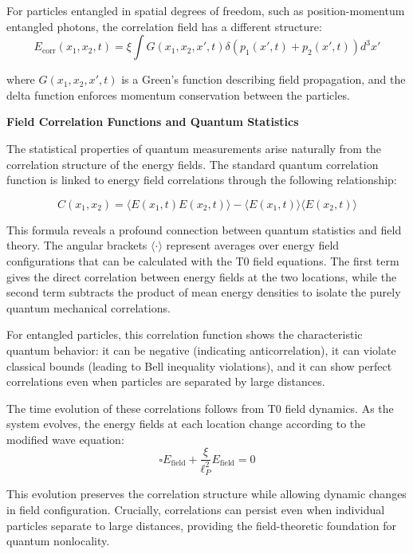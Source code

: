 \documentclass[12pt,a4paper]{article}
\newcommand{\xipar}{\xi}
\theoremstyle{definition}
\theoremstyle{remark}
\begin{document}
For particles entangled in spatial degrees of freedom, such as position-momentum entangled photons, the correlation field has a different structure:
\begin{equation}
	E_{\text{corr}}(x_1,x_2,t) = \xipar \int G(x_1,x_2,x',t) \delta(p_1(x',t) + p_2(x',t)) d^3x'
	\label{eq:position_momentum_correlation}
\end{equation}

where $G(x_1,x_2,x',t)$ is a Green's function describing field propagation, and the delta function enforces momentum conservation between the particles.

\textbf{Field Correlation Functions and Quantum Statistics}

The statistical properties of quantum measurements arise naturally from the correlation structure of the energy fields. The standard quantum correlation function is linked to energy field correlations through the following relationship:

\begin{equation}
	C(x_1,x_2) = \langle E(x_1,t) E(x_2,t) \rangle - \langle E(x_1,t) \rangle \langle E(x_2,t) \rangle
	\label{eq:field_correlation_function}
\end{equation}

This formula reveals a profound connection between quantum statistics and field theory. The angular brackets $\langle \cdot \rangle$ represent averages over energy field configurations that can be calculated with the T0 field equations. The first term gives the direct correlation between energy fields at the two locations, while the second term subtracts the product of mean energy densities to isolate the purely quantum mechanical correlations.

For entangled particles, this correlation function shows the characteristic quantum behavior: it can be negative (indicating anticorrelation), it can violate classical bounds (leading to Bell inequality violations), and it can show perfect correlations even when particles are separated by large distances.

The time evolution of these correlations follows from T0 field dynamics. As the system evolves, the energy fields at each location change according to the modified wave equation:
$$\square E_{\text{field}} + \frac{\xipar}{\ell_P^2} E_{\text{field}} = 0$$

This evolution preserves the correlation structure while allowing dynamic changes in field configuration. Crucially, correlations can persist even when individual particles separate to large distances, providing the field-theoretic foundation for quantum nonlocality.
\end{document}
